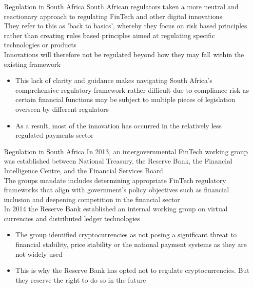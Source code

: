 \documentclass[11pt]{beamer}
\begin{document}
\begin{frame}{Regulation in South Africa}
	South African regulators taken a more neutral and reactionary approach to regulating FinTech and other digital innovations \\ \vspace{2mm}
	They refer to this as 'back to basics', whereby they focus on risk based principles rather than creating rules based principles aimed at regulating specific technologies or products\\ \vspace{2mm}
	Innovations will therefore not be regulated beyond how they may fall within the existing framework
	\begin{itemize}
		\item This lack of clarity and guidance makes navigating South Africa's comprehensive regulatory framework rather difficult due to compliance risk as certain financial functions may be subject to multiple pieces of legislation overseen by different regulators
		\item As a result, most of the innovation has occurred in the relatively less regulated payments sector
	\end{itemize}
\end{frame}


\begin{frame}{Regulation in South Africa}
	In 2013, an intergovernmental FinTech working group was established between National Treasury, the Reserve Bank, the Financial Intelligence Centre, and the Financial Services Board \\ \vspace{3mm}
	The groups mandate includes determining appropriate FinTech regulatory frameworks that align with government's policy objectives such as financial inclusion and deepening competition in the financial sector\\ \vspace{3mm}
	In 2014 the Reserve Bank established an internal working group on virtual currencies and distributed ledger technologies
	\begin{itemize}
		\item The group identified cryptocurrencies as not posing a significant threat to financial stability, price stability or the national payment systems as they are not widely used
		\item This is why the Reserve Bank has opted not to regulate cryptocurrencies. But they reserve the right to do so in the future
	\end{itemize}
\end{frame}
\end{document}
